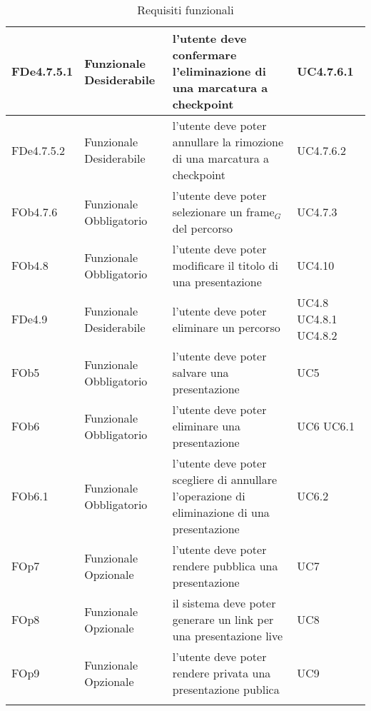 \begin{longtable}{|l|p{2.5cm}|p{5cm}|p{3.5cm}|}
\hline
FDe4.7.5.1 & Funzionale \linebreak Desiderabile & l'utente deve confermare l'eliminazione di una marcatura a checkpoint & UC4.7.6.1 \linebreak  \\
\hline
FDe4.7.5.2 & Funzionale \linebreak Desiderabile & l'utente deve poter annullare la rimozione di una marcatura a checkpoint & UC4.7.6.2 \linebreak  \\
\hline
FOb4.7.6 & Funzionale \linebreak Obbligatorio & l'utente deve poter selezionare un frame$_G$ del percorso & UC4.7.3 \linebreak  \\
\hline
FOb4.8 & Funzionale \linebreak Obbligatorio & l'utente deve poter modificare il titolo di una presentazione & UC4.10 \linebreak  \\
\hline
FDe4.9 & Funzionale \linebreak Desiderabile & l'utente deve poter eliminare un percorso & UC4.8 \linebreak  UC4.8.1 \linebreak  UC4.8.2 \linebreak  \\
\hline
FOb5 & Funzionale \linebreak Obbligatorio & l'utente deve poter salvare una presentazione & UC5 \linebreak \\
\hline
FOb6 & Funzionale \linebreak Obbligatorio & l'utente deve poter eliminare una presentazione & UC6 \linebreak UC6.1 \linebreak \\
\hline
FOb6.1 & Funzionale \linebreak Obbligatorio & l'utente deve poter scegliere di annullare l'operazione di eliminazione di una presentazione & UC6.2 \linebreak  \\
\hline
FOp7 & Funzionale \linebreak Opzionale & l'utente deve poter rendere pubblica una presentazione & UC7 \linebreak \\
\hline
FOp8 & Funzionale \linebreak Opzionale & il sistema deve poter generare un link per una presentazione live & UC8 \linebreak \\
\hline
FOp9 & Funzionale \linebreak Opzionale & l'utente deve poter rendere privata una presentazione publica & UC9 \linebreak \\
\hline
\caption{Requisiti funzionali}
\end{longtable}
